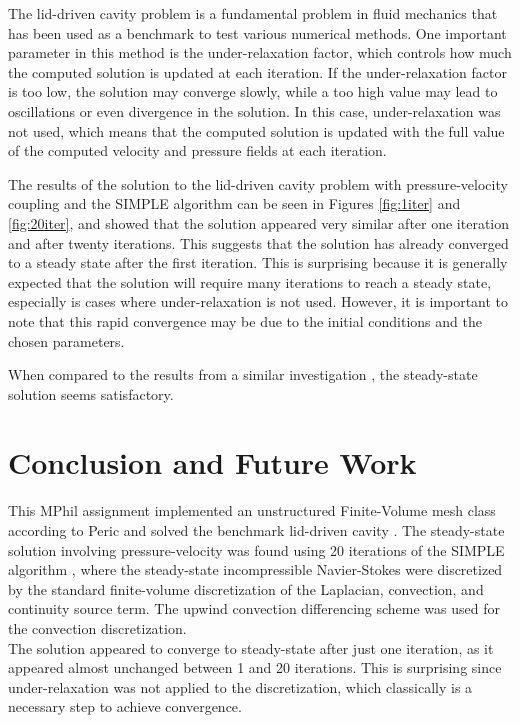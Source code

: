 \documentclass[final,3p,times,twocolumn]{elsarticle}
\begin{document}
The lid-driven cavity problem is a fundamental problem in fluid mechanics that has been used as a benchmark to test various numerical methods. One important parameter in this method is the under-relaxation factor, which controls how much the computed solution is updated at each iteration. If the under-relaxation factor is too low, the solution may converge slowly, while a too high value may lead to oscillations or even divergence in the solution. In this case, under-relaxation was not used, which means that the computed solution is updated with the full value of the computed velocity and pressure fields at each iteration.

The results of the solution to the lid-driven cavity problem with pressure-velocity coupling and the SIMPLE algorithm can be seen in Figures \ref{fig:1iter} and \ref{fig:20iter}, and showed that the solution appeared very similar after one iteration and after twenty iterations. This suggests that the solution has already converged to a steady state after the first iteration. This is surprising because it is generally expected that the solution will require many iterations to reach a steady state, especially is cases where under-relaxation is not used. However, it is important to note that this rapid convergence may be due to the initial conditions and the chosen parameters. 

When compared to the results from a similar investigation \cite{StracciaA2018HowBlog}, the steady-state solution seems satisfactory.

\section{Conclusion and Future Work}
This MPhil assignment implemented an unstructured Finite-Volume mesh class according to Peric \cite{Peric1985ADucts.} and solved the benchmark lid-driven cavity \cite{Ghia1982High-ReMethod}. The steady-state solution involving pressure-velocity was found using 20 iterations of the SIMPLE algorithm \cite{Patankar1972AFLOWS}, where the steady-state incompressible Navier-Stokes were discretized by the standard finite-volume discretization of the Laplacian, convection, and continuity source term. The upwind convection differencing scheme was used for the convection discretization. \\ The solution appeared to converge to steady-state after just one iteration, as it appeared almost unchanged between 1 and 20 iterations. This is surprising since under-relaxation was not applied to the discretization, which classically is a necessary step to achieve convergence. 
\end{document}
